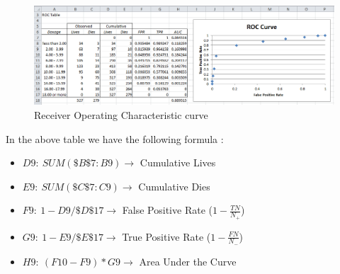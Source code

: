 \begin{figure}[H]
    \begin{center}
        \includegraphics[width=\textwidth]{chapters/2_statistics/03_bayesian_approach/images/1_roc_curve_with_table.png}
    \end{center}
    \caption{Receiver Operating Characteristic curve}
    \label{fig:1_roc_curve_with_table}
\end{figure}
In the above table we have the following formula :
\begin{itemize}
    \item $D9:~SUM(\$B\$7:B9) \rightarrow$ Cumulative Lives
    \item $E9:~SUM(\$C\$7:C9) \rightarrow$ Cumulative Dies
    \item $F9:~1 - D9/\$D\$17 \rightarrow$ False Positive Rate ($1-\frac{TN}{N_{+}}$)
    \item $G9:~1 - E9/\$E\$17 \rightarrow$ True Positive Rate ($1-\frac{FN}{N_{-}}$)
    \item $H9:~(F10-F9)*G9 \rightarrow$ Area Under the Curve
\end{itemize}




